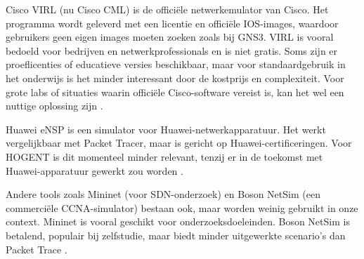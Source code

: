 Cisco VIRL (nu Cisco CML) is de officiële netwerkemulator van Cisco. Het programma wordt geleverd met een licentie en officiële IOS-images, waardoor gebruikers geen eigen images moeten zoeken zoals bij GNS3. VIRL is vooral bedoeld voor bedrijven en netwerkprofessionals en is niet gratis. Soms zijn er proeflicenties of educatieve versies beschikbaar, maar voor standaardgebruik in het onderwijs is het minder interessant door de kostprijs en complexiteit. Voor grote labs of situaties waarin officiële Cisco-software vereist is, kan het wel een nuttige oplossing zijn \autocite{cisco-cml}.

\vspace{0.3cm}

Huawei eNSP is een simulator voor Huawei-netwerkapparatuur. Het werkt vergelijkbaar met Packet Tracer, maar is gericht op Huawei-certificeringen. Voor HOGENT is dit momenteel minder relevant, tenzij er in de toekomst met Huawei-apparatuur gewerkt zou worden \autocite{huawei-ensp}.

\vspace{0.3cm}

Andere tools zoals Mininet (voor SDN-onderzoek) en Boson NetSim (een commerciële CCNA-simulator) bestaan ook, maar worden weinig gebruikt in onze context. Mininet is vooral geschikt voor onderzoeksdoeleinden. Boson NetSim is betalend, populair bij zelfstudie, maar biedt minder uitgewerkte scenario’s dan Packet Trace \autocite{huawei-ensp, cisco-cml}.


